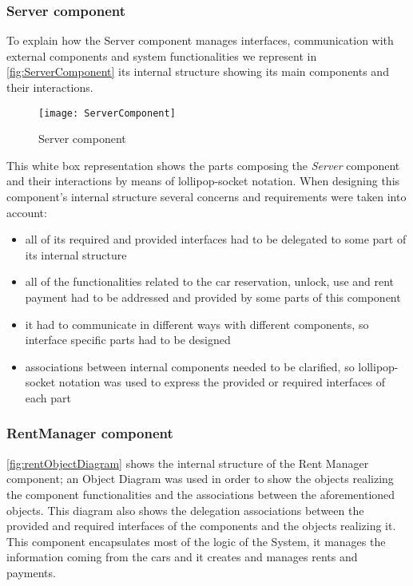 \subsubsection{Server component}
To explain how the Server component manages interfaces, communication with external components and system functionalities we represent in \autoref{fig:ServerComponent} its internal structure showing its main components and their interactions.
\\

\begin{figure}[h]
			\centering
			\texttt{[image: ServerComponent]}
			\caption{
				\label{fig:ServerComponent} 
				Server component
			}
		\end{figure}
\clearpage

This white box representation shows the parts composing the \emph{Server} component and their interactions by means of lollipop-socket notation. When designing this component's internal structure several concerns and requirements were taken into account:
\begin{itemize}
	\item all of its required and provided interfaces had to be delegated to some part of its internal structure
	\item all of the functionalities related to the car reservation, unlock, use and rent payment had to be addressed and provided by some parts of this component
	\item it had to communicate in different ways with different components, so interface specific parts had to be designed
	\item associations between internal components needed to be clarified, so lollipop-socket notation was used to express the provided or required interfaces of each part
\end{itemize}

\subsubsection{RentManager component}

\autoref{fig:rentObjectDiagram} shows the internal structure of the Rent Manager component; an \mbox{Object} \mbox{Diagram} was used in order to show the objects realizing the component functionalities and the associations between the aforementioned objects. This diagram also shows the delegation associations between the provided and required interfaces of the components and the objects realizing it.
\\
This component encapsulates most of the logic of the System, it manages the information coming from the cars and it creates and manages rents and payments. 

